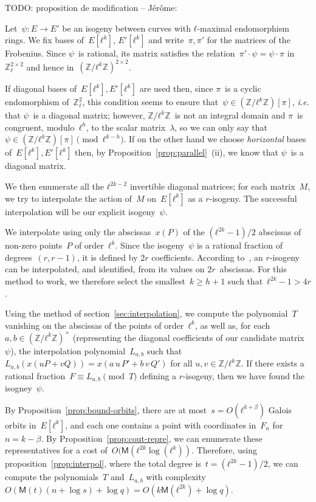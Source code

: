 \documentclass{lms}
\newcommand{\todo}[1]{{\color{red}TODO: #1}}
\def\cout#1{\mathsf{#1}}
\newcommand{\MM}{\cout{M}}
\begin{document}
\todo{proposition de modification -- Jérôme:

Let~$ψ: E→ E'$ be an isogeny between curves
with $ℓ$-maximal endomorphism rings.
We fix bases of~$E[ℓ^k]$, $E'[ℓ^k]$ and write~$π, π'$ for the matrices
of the Frobenius.
Since $ψ$~is rational, its matrix satisfies the relation~$π' · ψ = ψ · π$
in $ℤ_ℓ^{2×2}$ and hence in~$(ℤ/ℓ^k ℤ)^{2 × 2}$.

If diagonal bases of~$E[ℓ^k], E'[ℓ^k]$ are used then,
since $π$~is a cyclic endomorphism of~$ℤ_ℓ^2$,
this condition seems to ensure that~$ψ ∈ (ℤ/ℓ^k ℤ)[π]$,
\emph{i.e.} that $ψ$~is a diagonal matrix;
however, $ℤ/ℓ^k ℤ$~is not an integral domain
and $π$~is congruent, modulo~$ℓ^h$, to the scalar matrix~$λ$,
so we can only say that~$ψ ∈ (ℤ/ℓ^k ℤ)[π] \pmod{ℓ^{k-h}}$.
If on the other hand we choose \emph{horizontal} bases
of~$E[ℓ^k], E'[ℓ^k]$ then, by Proposition~\ref{prop:parallel}~(ii),
we know that $ψ$~is a diagonal matrix.

We then enumerate all the $ℓ^{2k-2}$ invertible diagonal matrices;
for each matrix~$M$, we try to interpolate
the action of~$M$ on~$E[ℓ^k]$ as a $r$-isogeny.
The successful interpolation will be our explicit isogeny~$ψ$.

We interpolate using only the abscissas~$x(P)$
of the $(ℓ^{2k}-1)/2$ abscissas of non-zero points~$P$ of order~$ℓ^k$.
Since the isogeny~$ψ$ is a rational fraction of degrees~$(r, r-1)$,
it is defined by $2r$ coefficients.
According to~\cite[§3.1]{df10},
an $r$-isogeny can be interpolated, and identified,
from its values on $2r$~abscissas.
For this method to work, we therefore select the smallest~$k ≥ h+1$
such that~$ℓ^{2k}-1 > 4r$.

Using the method of section~\ref{sec:interpolation},
we compute the polynomial~$T$ vanishing on the abscissas of
the points of order~$ℓ^k$,
as well as, for each $a, b ∈ (ℤ/ℓ^k ℤ)^×$
(representing the diagonal coefficients of our candidate matrix $ψ$),
the interpolation polynomial~$L_{a,b}$
such that $L_{a,b} (x (u P + v Q)) = x(a\, u\,P' + b\,v\, Q')$
for all $u, v ∈ ℤ/ℓ^k ℤ$.
If there exists a rational fraction~$F ≡ L_{a,b} \pmod{T}$
defining a $r$-isogeny,
then we have found the isogney~$ψ$.

By Proposition~\ref{prop:bound-orbits},
there are at most~$s = O(ℓ^{k+β})$ Galois orbits in~$E[ℓ^k]$,
and each one contains a point with coordinates in~$F_n$ for~$n = k-β$.
By Proposition~\ref{prop:cout-repre},
we can enumerate these representatives for a cost
of~$O(\MM(ℓ^{2k} \log(ℓ^k))$.
Therefore, using proposition~\ref{prop:interpol},
where the total degree is~$t = (ℓ^{2k}-1)/2$,
we can compute the polynomials~$T$ and~$L_{a,b}$ with
complexity~$O(\MM(t) (n + \log s) + \log q)
= O(k \MM(ℓ^{2k}) + \log q)$.

}
\end{document}
